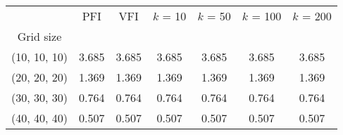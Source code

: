 \begin{tabular}{ccccccc}
\toprule
{} &    PFI &    VFI &  $k$ = 10 &  $k$ = 50 &  $k$ = 100 &  $k$ = 200 \\
Grid size    &        &        &           &           &            &            \\
\midrule
(10, 10, 10) &  3.685 &  3.685 &     3.685 &     3.685 &      3.685 &      3.685 \\
(20, 20, 20) &  1.369 &  1.369 &     1.369 &     1.369 &      1.369 &      1.369 \\
(30, 30, 30) &  0.764 &  0.764 &     0.764 &     0.764 &      0.764 &      0.764 \\
(40, 40, 40) &  0.507 &  0.507 &     0.507 &     0.507 &      0.507 &      0.507 \\
\bottomrule
\end{tabular}
